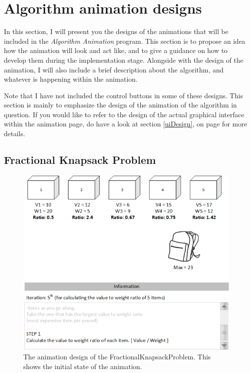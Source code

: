 \section{Algorithm animation designs}
In this section, I will present you the designs of the animations that will be included in the \textit{Algorithm Animation} program. This section is to propose an idea how the animation will look and act like, and to give a guidance on how to develop them during the implementation stage. Alongside with the design of the animation, I will also include a brief description about the algorithm, and whatever is happening within the animation.

Note that I have not included the control buttons in some of these designs. This section is mainly to emphasize the design of the animation of the algorithm in question. If you would like to refer to the design of the actual graphical interface within the animation page, do have a look at section \ref{uiDesign}, on page \pageref{uiDesign} for more details.

\subsection{Fractional Knapsack Problem}
\begin{figure}[H]
\centering
\includegraphics[scale=1]{images/report_images/animationDesignFractionalKnapsackProblem_STEP1.png}
\caption{The animation design of the FractionalKnapsackProblem. This shows the initial state of the animation.}
\label{animationDesignFractionalKnapsackProblem}
\end{figure}

